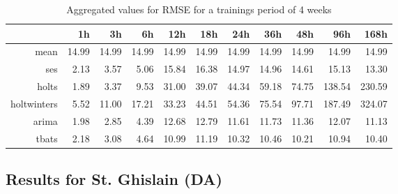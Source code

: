 \begin{table}[ht]
\centering
\begin{tabular}{rrrrrrrrrrr}
  \hline
 & 1h & 3h & 6h & 12h & 18h & 24h & 36h & 48h & 96h & 168h \\ 
  \hline
mean & 14.99 & 14.99 & 14.99 & 14.99 & 14.99 & 14.99 & 14.99 & 14.99 & 14.99 & 14.99 \\ 
  ses & 2.13 & 3.57 & 5.06 & 15.84 & 16.38 & 14.97 & 14.96 & 14.61 & 15.13 & 13.30 \\ 
  holts & 1.89 & 3.37 & 9.53 & 31.00 & 39.07 & 44.34 & 59.18 & 74.75 & 138.54 & 230.59 \\ 
  holtwinters & 5.52 & 11.00 & 17.21 & 33.23 & 44.51 & 54.36 & 75.54 & 97.71 & 187.49 & 324.07 \\ 
  arima & 1.98 & 2.85 & 4.39 & 12.68 & 12.79 & 11.61 & 11.73 & 11.36 & 12.07 & 11.13 \\ 
  tbats & 2.18 & 3.08 & 4.64 & 10.99 & 11.19 & 10.32 & 10.46 & 10.21 & 10.94 & 10.40 \\ 
   \hline
\end{tabular}
\caption{Aggregated values for RMSE for a trainings period of 4 weeks}
\end{table}



\subsection{Results for St. Ghislain (DA)}

